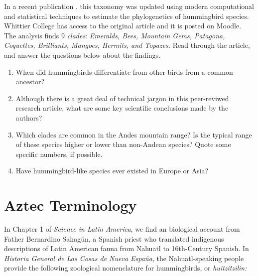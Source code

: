 \documentclass[12pt]{article}
\begin{document}
In a recent publication \cite{10.1016/j.cub.2014.03.016}, this taxonomy was updated using modern computational and statistical techniques to estimate the phylogenetics of hummingbird species.  Whittier College has access to the original article and it is posted on Moodle.  The analysis finds 9 \textit{clades}: \textit{Emeralds, Bees, Mountain Gems, Patagona, Coquettes, Brilliants, Mangoes, Hermits, and Topazes.}  Read through the article, and answer the questions below about the findings.

\begin{enumerate}
\item When did hummingbirds differentiate from other birds from a common ancestor? \\ \vspace{1cm}
\item Although there is a great deal of technical jargon in this peer-reviwed research article, what are some key scientific conclusions made by the authors? \\ \vspace{2cm}
\item Which clades are common in the Andes mountain range?  Is the typical range of these species higher or lower than non-Andean species? Quote some specific numbers, if possible.  \\ \vspace{1cm}
\item Have hummingbird-like species ever existed in Europe or Asia? \\ \vspace{1cm}
\end{enumerate}

\section{Aztec Terminology}

In Chapter 1 of \textit{Science in Latin America}, we find an biological account from Father Bernardino Sahag\'{u}n, a Spanish priest who translated indigenous descriptions of Latin American fauna from Nahuatl to 16th-Century Spanish.  In \textit{Historia General de Las Cosas de Nueva Espa\~{n}a}, the Nahuatl-speaking people provide the following zoological nomenclature for hummingbirds, or \textit{huitzitzilin:}
\end{document}
